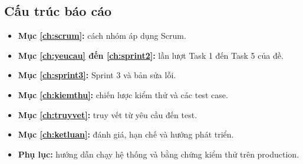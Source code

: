 \subsection{Cấu trúc báo cáo}
\begin{itemize}
\item \textbf{Mục \ref{ch:scrum}:} cách nhóm áp dụng Scrum.
\item \textbf{Mục \ref{ch:yeucau} đến \ref{ch:sprint2}:} lần lượt Task 1 đến Task 5 của đề.
\item \textbf{Mục \ref{ch:sprint3}:} Sprint 3 và bản sửa lỗi.
\item \textbf{Mục \ref{ch:kiemthu}:} chiến lược kiểm thử và các test case.
\item \textbf{Mục \ref{ch:truyvet}:} truy vết từ yêu cầu đến test.
\item \textbf{Mục \ref{ch:ketluan}:} đánh giá, hạn chế và hướng phát triển.
\item \textbf{Phụ lục:} hướng dẫn chạy hệ thống và bằng chứng kiểm thử trên production.
\end{itemize}
